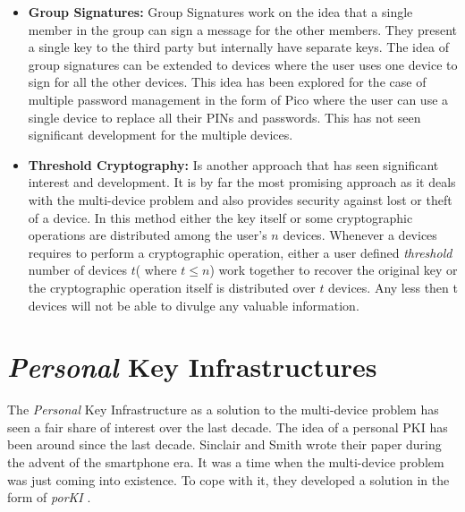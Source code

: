 \begin{itemize}
	\item \textbf{Group Signatures:} Group Signatures work on the idea that a single member in the group can sign a message for the other 						members. They present a single key to the third party but internally have separate keys\cite{Bellare2003}. The idea of group signatures can be 			extended to devices where the user uses one device to sign for all the other devices. This idea has been explored for the case of multiple 					password management in the form of Pico\cite{Stajano2011} where the user can use a single device to replace all their PINs and passwords. 				This has not seen significant development for the multiple devices. \\

	\item \textbf{Threshold Cryptography:} Is another approach that has seen significant interest and development. It is by far the most promising 			approach as it deals with the multi-device problem and also provides security against lost or theft of a device\cite{Desmedt2001}. In this 					method either the key itself or some cryptographic operations are distributed among the user's $n$ devices\cite{Desmedt1994}. Whenever a 			devices requires to perform a cryptographic operation, either a user defined \emph{threshold} number of devices $t$( where $t \leqslant n$) 			work together to recover the original key or the cryptographic operation itself is distributed over $t$ devices. Any less then t devices will not 			be able to divulge any valuable information.

\end{itemize}



\section{\emph{Personal} Key Infrastructures}

The \textit{Personal} Key Infrastructure as a solution to the multi-device problem has seen a fair share of interest over the last decade. The idea of a personal PKI has been around since the last decade. Sinclair and Smith wrote their paper during the advent of the smartphone era. It was a time when the multi-device problem was just coming into existence. To cope with it, they developed a solution in the form of \textit{porKI} \cite{Sinclair2005}.

